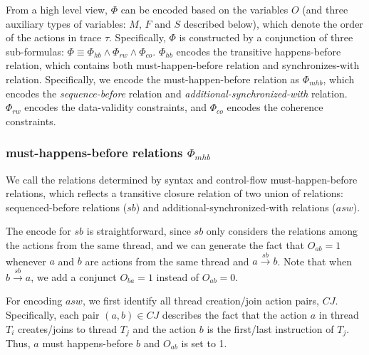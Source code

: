 \documentclass[preprint, numbers, 10pt]{sigplanconf}
\begin{document}

From a high level view, $\Phi$ can be encoded based on the variables $O$
(and three auxiliary types of variables: $M$, $F$ and $S$ described below), 
which denote the order of the actions in trace $\tau$. 
Specifically, $\Phi$ is constructed by a 
conjunction of three sub-formulas: $\Phi\equiv\Phi_{hb}\wedge\Phi_{rw}\wedge\Phi_{co}$.
$\Phi_{hb}$ encodes the transitive happens-before relation, which contains both
must-happen-before relation and synchronizes-with relation. Specifically, we encode
the must-happen-before relation as $\Phi_{mhb}$, which encodes the \textit{sequence-before} 
relation and \textit{additional-synchronized-with} relation.
$\Phi_{rw}$ encodes the data-validity constraints, %
and $\Phi_{co}$ encodes the coherence constraints. 


\subsubsection{must-happens-before relations $\Phi_{mhb}$}

We call the relations determined by syntax and control-flow must-happen-before relations,
which reflects a transitive closure relation of two union of relations: sequenced-before
relations ($sb$) and additional-synchronized-with relations ($asw$). 

The encode for $sb$ is straightforward, since $sb$ only 
considers the relations among the actions from the same thread, and 
we can generate the fact that $O_{ab}=1$ whenever 
$a$ and $b$ are actions from the same thread and $a \stackrel{sb}{\longrightarrow} b$. 
Note that when $b \stackrel{sb}{\longrightarrow} a$, we add a conjunct $O_{ba}=1$ instead of
$O_{ab}=0$. 

For encoding $asw$, we first identify all thread creation/join action pairs, $CJ$.
Specifically, each pair $(a,b)\in CJ$ describes the fact that the action $a$ in thread $T_i$ creates/joins to 
thread $T_j$ and the action $b$ is the first/last instruction of $T_j$. Thus,
$a$ must happens-before $b$ and $O_{ab}$ is set to 1.
\end{document}
